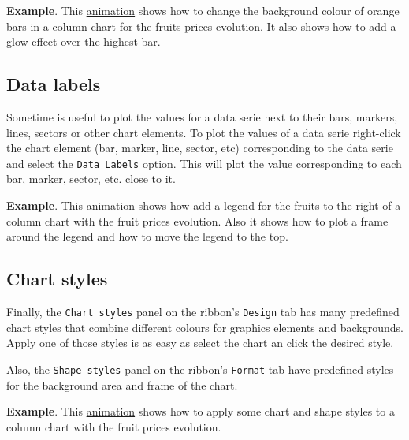 \textbf{Example}. This \href{http://aprendeconalf.es/office/excel/manual/img/example_chart_data_series.gif}{animation} shows how to change the background colour of orange bars in a column chart for the fruits prices evolution. It also shows how to add a glow effect over the highest bar.

\subsection{Data labels}\hypertarget{data-labels}{}\label{data-labels}

Sometime is useful to plot the values for a data serie next to their bars, markers, lines, sectors or other chart elements. To plot the values of a data serie right-click the chart element (bar, marker, line, sector, etc) corresponding to the data serie and select the \texttt{Data Labels} option. This will plot the value corresponding to each bar, marker, sector, etc. close to it.

\textbf{Example}. This \href{http://aprendeconalf.es/office/excel/manual/img/example_chart_data_labels.gif}{animation} shows how add a legend for the fruits to the right of a column chart with the fruit prices evolution. Also it shows how to plot a frame around the legend and how to move the legend to the top.

\subsection{Chart styles}\hypertarget{chart-styles}{}\label{chart-styles}

Finally, the \texttt{Chart styles} panel on the ribbon's \texttt{Design} tab has many predefined chart styles that combine different colours for graphics elements and backgrounds. Apply one of those styles is as easy as select the chart an click the desired style.

Also, the \texttt{Shape styles} panel on the ribbon's \texttt{Format} tab have predefined styles for the background area and frame of the chart.

\textbf{Example}. This \href{http://aprendeconalf.es/office/excel/manual/img/example_chart_styles.gif}{animation} shows how to apply some chart and shape styles to a column chart with the fruit prices evolution.

